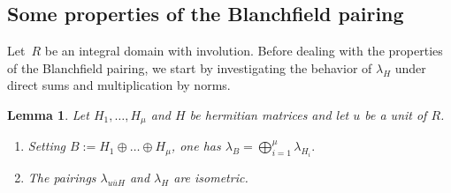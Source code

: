 \documentclass[11pt,a4paper]{amsart}
\newtheorem{lemma}[theorem]{Lemma}
\theoremstyle{definition}
\begin{document}
\subsection{Some properties of the Blanchfield pairing}
\label{sub:Operations}
Let~$R$ be an
integral domain with involution. Before dealing with the properties of the Blanchfield pairing, we start by investigating the behavior of $\lambda_H$ under direct sums and multiplication by norms.
\begin{lemma}
\label{lem:Additivity}
Let $H_1,\ldots, H_\mu$ and $H$ be hermitian matrices and let $u$ be a unit of $R$.
\begin{enumerate}
\item Setting $B:=H_1 \oplus \ldots \oplus H_\mu$, one has $\lambda_B=\bigoplus_{i=1}^\mu \lambda_{H_i}.$
\item The pairings $\lambda_{u \overline{u} H}$ and $\lambda_H$ are isometric.
\end{enumerate}
\end{lemma}
\end{document}
